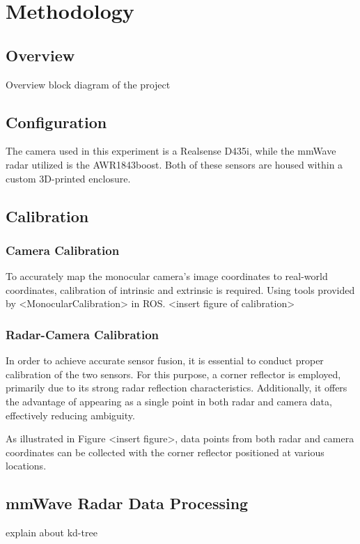 
\chapter{Methodology}\label{chap:related_works}

\section{Overview}\label{sec:2-overview}
Overview block diagram of the project

\section{Configuration}\label{sec:2-spec}
The camera used in this experiment is a Realsense D435i, while the mmWave radar utilized is the AWR1843boost.
Both of these sensors are housed within a custom 3D-printed enclosure.

\section{Calibration}\label{sec:2-calibration}
\subsection*{Camera Calibration}
To accurately map the monocular camera's image coordinates to real-world coordinates, calibration of intrinsic and extrinsic is required.
Using tools provided by <MonocularCalibration> in ROS.%
<insert figure of calibration>

\subsection*{Radar-Camera Calibration}
In order to achieve accurate sensor fusion, it is essential to conduct proper calibration of the two sensors. 
For this purpose, a corner reflector is employed, primarily due to its strong radar reflection characteristics. 
Additionally, it offers the advantage of appearing as a single point in both radar and camera data, effectively reducing ambiguity.

As illustrated in Figure <insert figure>, data points from both radar 
and camera coordinates can be collected with the corner reflector positioned at various locations.



\section{mmWave Radar Data Processing}\label{sec:2-kd_tree}
explain about kd-tree

